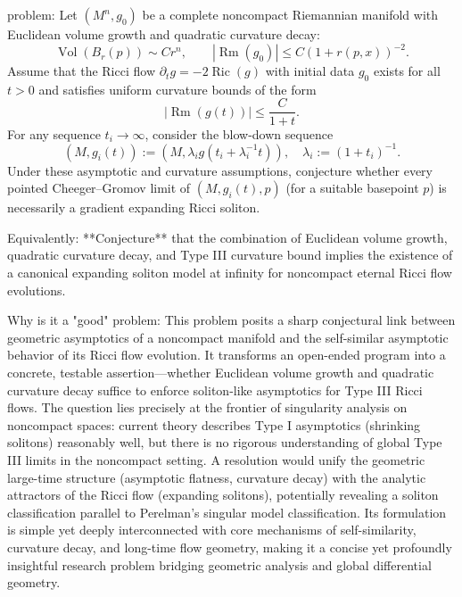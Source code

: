 problem:  
Let \((M^n, g_0)\) be a complete noncompact Riemannian manifold with Euclidean volume growth and quadratic curvature decay:
\[
\operatorname{Vol}(B_r(p)) \sim C r^n, \qquad |\operatorname{Rm}(g_0)| \leq C(1 + r(p,x))^{-2}.
\]
Assume that the Ricci flow \(\partial_t g = -2\operatorname{Ric}(g)\) with initial data \(g_0\) exists for all \(t > 0\) and satisfies uniform curvature bounds of the form
\[
|\operatorname{Rm}(g(t))| \leq \frac{C}{1+t}.
\]
For any sequence \(t_i \to \infty\), consider the blow-down sequence
\[
(M, g_i(t)) := (M, \lambda_i g(t_i + \lambda_i^{-1}t)), \quad \lambda_i := (1 + t_i)^{-1}.
\]
Under these asymptotic and curvature assumptions, conjecture whether every pointed Cheeger–Gromov limit of \((M, g_i(t), p)\) (for a suitable basepoint \(p\)) is necessarily a gradient expanding Ricci soliton.

Equivalently: **Conjecture** that the combination of Euclidean volume growth, quadratic curvature decay, and Type III curvature bound implies the existence of a canonical expanding soliton model at infinity for noncompact eternal Ricci flow evolutions.

Why is it a "good" problem:  
This problem posits a sharp conjectural link between geometric asymptotics of a noncompact manifold and the self-similar asymptotic behavior of its Ricci flow evolution. It transforms an open-ended program into a concrete, testable assertion—whether Euclidean volume growth and quadratic curvature decay suffice to enforce soliton-like asymptotics for Type III Ricci flows. The question lies precisely at the frontier of singularity analysis on noncompact spaces: current theory describes Type I asymptotics (shrinking solitons) reasonably well, but there is no rigorous understanding of global Type III limits in the noncompact setting. A resolution would unify the geometric large-time structure (asymptotic flatness, curvature decay) with the analytic attractors of the Ricci flow (expanding solitons), potentially revealing a soliton classification parallel to Perelman’s singular model classification. Its formulation is simple yet deeply interconnected with core mechanisms of self-similarity, curvature decay, and long-time flow geometry, making it a concise yet profoundly insightful research problem bridging geometric analysis and global differential geometry.
